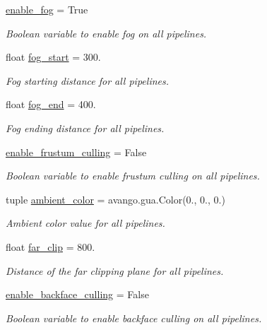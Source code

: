 \begin{DoxyCompactItemize}
\hyperlink{classlib_1_1User_1_1User_a7abdac6418eb34abb226a1303bf14597}{enable\-\_\-fog} = \-True
\begin{DoxyCompactList}\small\item\em \-Boolean variable to enable fog on all pipelines. \end{DoxyCompactList}\item 
float \hyperlink{classlib_1_1User_1_1User_a023761a05fa8e4fb2d760ba778e14207}{fog\-\_\-start} = 300.
\begin{DoxyCompactList}\small\item\em \-Fog starting distance for all pipelines. \end{DoxyCompactList}\item 
float \hyperlink{classlib_1_1User_1_1User_abb967cb1e2b1c53747d3fc658b146e85}{fog\-\_\-end} = 400.
\begin{DoxyCompactList}\small\item\em \-Fog ending distance for all pipelines. \end{DoxyCompactList}\item 
\hyperlink{classlib_1_1User_1_1User_a6ae1d735cc350461e3a3ce700038a1dd}{enable\-\_\-frustum\-\_\-culling} = \-False
\begin{DoxyCompactList}\small\item\em \-Boolean variable to enable frustum culling on all pipelines. \end{DoxyCompactList}\item 
tuple \hyperlink{classlib_1_1User_1_1User_ad7d2cfa4d7167c9a32e3f688cf9bf215}{ambient\-\_\-color} = avango.\-gua.\-Color(0., 0., 0.)
\begin{DoxyCompactList}\small\item\em \-Ambient color value for all pipelines. \end{DoxyCompactList}\item 
float \hyperlink{classlib_1_1User_1_1User_afef9ed6223dcef7768e39b7f134c94f6}{far\-\_\-clip} = 800.
\begin{DoxyCompactList}\small\item\em \-Distance of the far clipping plane for all pipelines. \end{DoxyCompactList}\item 
\hyperlink{classlib_1_1User_1_1User_a63294fc5fa5d9d91eb64095341ad9bb5}{enable\-\_\-backface\-\_\-culling} = \-False
\begin{DoxyCompactList}\small\item\em \-Boolean variable to enable backface culling on all pipelines. \end{DoxyCompactList}\item 

\end{DoxyCompactItemize}
